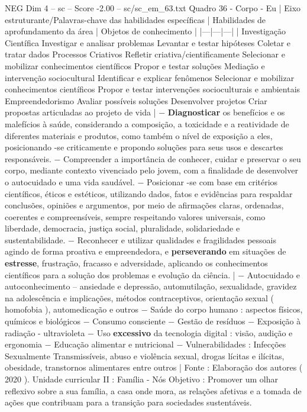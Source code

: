 \begin{textsample}{NEG Dim 4 – sc – Score -2.00 – sc/sc\_em\_63.txt}
Quadro 36 - Corpo - Eu | Eixo estruturante/Palavras-chave das habilidades específicas | Habilidades de aprofundamento da área | Objetos de conhecimento | |---|---|---| | Investigação Científica Investigar e analisar problemas Levantar e testar hipóteses Coletar e tratar dados Processos Criativos Refletir criativa/cientificamente Selecionar e mobilizar conhecimentos científicos Propor e testar soluções Mediação e intervenção sociocultural Identificar e explicar fenômenos Selecionar e mobilizar conhecimentos científicos Propor e testar intervenções socioculturais e ambientais Empreendedorismo Avaliar possíveis soluções Desenvolver projetos Criar propostas articuladas ao projeto de vida | − \textbf{Diagnosticar} os benefícios e os malefícios à saúde, considerando a composição, a toxicidade e a reatividade de diferentes materiais e produtos, como também o nível de exposição a eles, posicionando -se criticamente e propondo soluções para seus usos e descartes responsáveis. − Compreender a importância de conhecer, cuidar e preservar o seu corpo, mediante contexto vivenciado pelo jovem, com a finalidade de desenvolver o autocuidado e uma vida saudável. − Posicionar -se com base em critérios científicos, éticos e estéticos, utilizando dados, fatos e evidências para respaldar conclusões, opiniões e argumentos, por meio de afirmações claras, ordenadas, coerentes e compreensíveis, sempre respeitando valores universais, como liberdade, democracia, justiça social, pluralidade, solidariedade e sustentabilidade. − Reconhecer e utilizar qualidades e fragilidades pessoais agindo de forma proativa e empreendedora, e \textbf{perseverando} em situações de \textbf{estresse}, frustração, fracasso e adversidade, aplicando os conhecimentos científicos para a solução dos problemas e evolução da ciência. | − Autocuidado e autoconhecimento – ansiedade e depressão, automutilação, sexualidade, gravidez na adolescência e implicações, métodos contraceptivos, orientação sexual ( homofobia ), automedicação e outros − Saúde do corpo humano : aspectos físicos, químicos e biológicos − Consumo consciente − Gestão de resíduos − Exposição à radiação - ultravioleta − Uso \textbf{excessivo} da tecnologia digital : visão, audição e ergonomia − Educação alimentar e nutricional − Vulnerabilidades : Infecções Sexualmente Transmissíveis, abuso e violência sexual, drogas lícitas e ilícitas, obesidade, transtornos alimentares entre outros | Fonte : Elaboração dos autores ( 2020 ).
Unidade curricular II : Família - Nós Objetivo : Promover um olhar reflexivo sobre a sua família, a casa onde mora, as relações afetivas e a tomada de ações que contribuam para a transição para sociedades sustentáveis.

\end{textsample}
